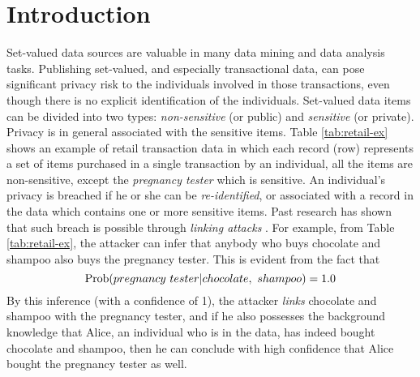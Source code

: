 \section{Introduction}
\label{sec:intro}

Set-valued data sources are valuable in many data mining and data analysis
tasks. 
Publishing set-valued, and especially transactional data,
can pose significant privacy risk to the
individuals involved in those transactions, even though
there is no explicit identification of the individuals.
Set-valued data items can be divided into two types:
{\em non-sensitive} (or public) and {\em sensitive} (or private).
Privacy is in general associated with the sensitive items.
Table \ref{tab:retail-ex} shows
an example of retail transaction data in which each record (row) represents
a set of items purchased in a single transaction by an individual,
  all the items are non-sensitive, except the {\em pregnancy tester}
which is sensitive. An individual's privacy is breached if he or she can be
{\em re-identified}, or associated with a record in the data which contains
one or more sensitive items. Past research has shown that such breach is
possible through {\em linking attacks} \cite{FungWCY10:Survey}. For example,
from Table \ref{tab:retail-ex}, the attacker can infer that anybody who buys
chocolate and shampoo also buys the pregnancy tester.
This is evident from the fact that
\[{\rm Prob}(pregnancy~tester | chocolate,~ shampoo) = 1.0\]
By this inference (with a confidence of 1), the attacker {\em links}
chocolate and shampoo with the pregnancy tester, and if he also possesses the
background knowledge that Alice, an individual who is in the data, has indeed
bought chocolate and shampoo, then he can conclude with high confidence that
Alice bought the pregnancy tester as well.

